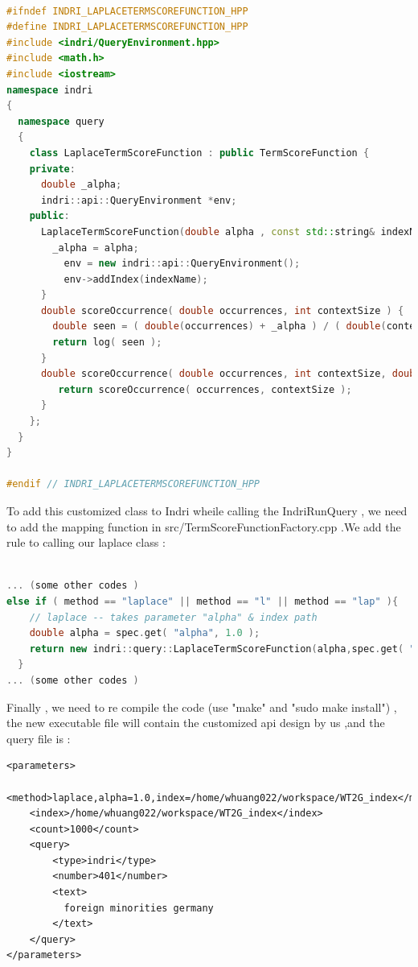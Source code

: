 \documentclass{article}
\begin{document}
\begin{lstlisting}[language=c++,caption={LaplaceTermScoreFunction.hpp},basicstyle=\footnotesize]

#ifndef INDRI_LAPLACETERMSCOREFUNCTION_HPP
#define INDRI_LAPLACETERMSCOREFUNCTION_HPP
#include <indri/QueryEnvironment.hpp>
#include <math.h>
#include <iostream>
namespace indri
{
  namespace query
  {
    class LaplaceTermScoreFunction : public TermScoreFunction {
    private:
      double _alpha;
      indri::api::QueryEnvironment *env;
    public:
      LaplaceTermScoreFunction(double alpha , const std::string& indexName) {
        _alpha = alpha;
	      env = new indri::api::QueryEnvironment(); 
	      env->addIndex(indexName);
      }
      double scoreOccurrence( double occurrences, int contextSize ) {
        double seen = ( double(occurrences) + _alpha ) / ( double(contextSize) + double(env->termCountUnique ()) );
        return log( seen );
      }
      double scoreOccurrence( double occurrences, int contextSize, double documentOccurrences, int documentLength ) {
         return scoreOccurrence( occurrences, contextSize );
      }
    };
  }
}

#endif // INDRI_LAPLACETERMSCOREFUNCTION_HPP
\end{lstlisting}

To add this customized class to Indri wheile calling the IndriRunQuery , we need to add 
the mapping function in src/TermScoreFunctionFactory.cpp .We add the rule to calling our laplace class :


\begin{lstlisting}[language=c++,caption={TermScoreFunctionFactory.cpp},basicstyle=\footnotesize]

... (some other codes )
else if ( method == "laplace" || method == "l" || method == "lap" ){
    // laplace -- takes parameter "alpha" & index path
    double alpha = spec.get( "alpha", 1.0 );
    return new indri::query::LaplaceTermScoreFunction(alpha,spec.get( "index", "" )); 
  }
... (some other codes )

\end{lstlisting}

Finally , we need to re compile the code (use "make" and "sudo make install") , the new executable file will contain 
the customized api design by us ,and the query file is :

\lstset{language=XML}
\begin{lstlisting}[caption={laplace.xml}]
  <parameters>
	<method>laplace,alpha=1.0,index=/home/whuang022/workspace/WT2G_index</method>  
	<index>/home/whuang022/workspace/WT2G_index</index>
	<count>1000</count>
	<query>
		<type>indri</type>
		<number>401</number>
		<text>
		  foreign minorities germany
		</text>
	</query>
</parameters>
\end{lstlisting}
\end{document}

